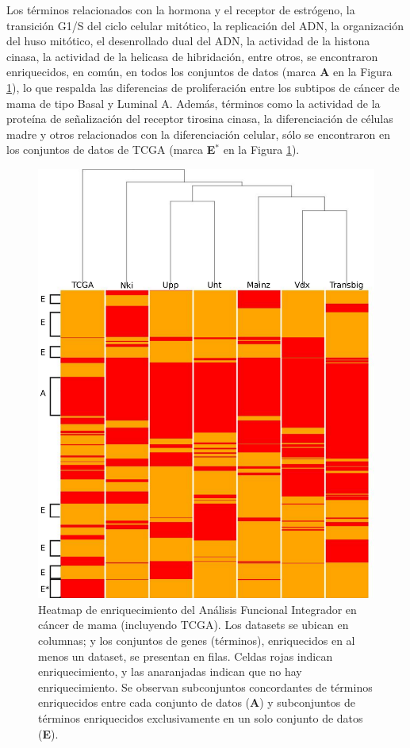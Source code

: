 \documentclass[12pt,twoside]{reedthesis}
\begin{document}
Los términos relacionados con la hormona y el receptor de estrógeno, la transición G1/S del ciclo celular mitótico, la replicación del ADN, la organización del huso mitótico, el desenrollado dual del ADN, la actividad de la histona cinasa, la actividad de la helicasa de hibridación, entre otros, se encontraron enriquecidos, en común, en todos los conjuntos de datos (marca \textbf{A} en la Figura \ref{fig:ifa5}), lo que respalda las diferencias de proliferación entre los subtipos de cáncer de mama de tipo Basal y Luminal A. Además, términos como la actividad de la proteína de señalización del receptor tirosina cinasa, la diferenciación de células madre y otros relacionados con la diferenciación celular, sólo se encontraron en los conjuntos de datos de TCGA (marca \textbf{E\(^*\)} en la Figura \ref{fig:ifa5}).
\begin{figure}

{\centering \includegraphics[width=1\linewidth]{images/IFA_FIG5} 

}

\caption{Heatmap de enriquecimiento del Análisis Funcional Integrador en cáncer de mama (incluyendo TCGA). Los datasets se ubican en columnas; y los conjuntos de genes (términos), enriquecidos en al menos un dataset, se presentan en filas. Celdas rojas indican enriquecimiento, y las anaranjadas indican que no hay enriquecimiento. Se observan subconjuntos concordantes de términos enriquecidos entre cada conjunto de datos (\textbf{A}) y subconjuntos de términos enriquecidos exclusivamente en un solo conjunto de datos (\textbf{E}).}\label{fig:ifa5}
\end{figure}
\end{document}
